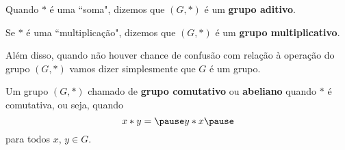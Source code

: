 \documentclass{beamer}
\begin{document}
    \begin{frame}
        \begin{observacao}
            Quando $*$ {\'e} uma ``soma", \pause dizemos que $(G,*)$ {\'e} um \textbf{grupo aditivo}.\pause

            \vspace{.3cm}

            Se $*$ {\'e} uma ``multiplica{\c c}{\~a}o", \pause dizemos que $(G,*)$ {\'e} um \textbf{grupo multiplicativo}.\pause

            \vspace{.3cm}
            Al\'em disso, quando n\~ao houver chance de confus\~ao com rela\c{c}\~ao \`a opera\c{c}\~ao do grupo $(G, *)$ \pause vamos dizer simplesmente que $G$ \'e um grupo.\pause
        \end{observacao}

        \begin{definicao}
            Um grupo $(G,*)$  chamado de \textbf{grupo comutativo} \pause ou \textbf{abeliano} \pause quando $*$ {\'e} comutativa, \pause ou seja, quando \pause
            \[
                x*y = \pause y*x \pause
            \]
            para todos $x$, $y \in G$.
        \end{definicao}
    \end{frame}
\end{document}
